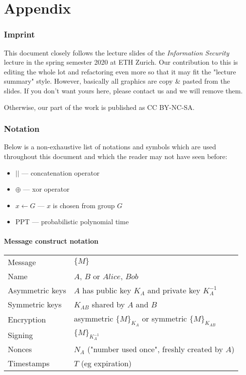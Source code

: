 %
%
\appendix

\part{Appendix}

\section{Imprint}

This document closely follows the lecture slides of the \textit{Information Security} lecture in the spring semester 2020 at ETH Zurich. Our contribution to this is editing the whole lot and refactoring even more so that it may fit the "lecture summary" style.
However, basically all graphics are copy \& pasted from the slides. If you don't want yours here, please contact us and we will remove them.

Otherwise, our part of the work is published as CC BY-NC-SA.


\section{Notation}

Below is a non-exhaustive list of notations and symbols which are used throughout this document and which the reader may not have seen before:

\begin{itemize}
    \item $||$ --- concatenation operator
    \item $\oplus$ --- xor operator
    \item $x \leftarrow G$ --- $x$ is chosen from group $G$
    \item PPT --- probabilistic polynomial time
\end{itemize}


\subsection{Message construct notation}

\begin{table}[h]
\centering
\begin{tabular}{ll}
Message & $\{ M \}$ \\
Name & $A$, $B$ or $Alice$, $Bob$ \\
Asymmetric keys &  $A$ has public key $K_A$ and private key $K_A^{-1}$ \\
Symmetric keys & $K_{AB}$ shared by $A$ and $B$ \\
Encryption &  asymmetric $\{ M \}_{K_A}$ or symmetric $\{ M \}_{K_{AB}}$ \\
Signing &  $\{ M \}_{K_A^{-1}}$\\
Nonces &  $N_A$ ("number used once", freshly created by $A$)\\
Timestamps & $T$ (eg expiration) \\
\end{tabular}
\end{table}

